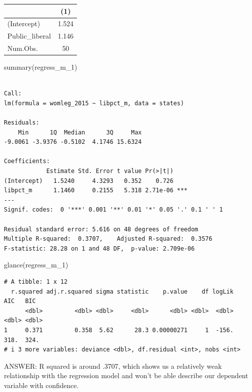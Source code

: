 \documentclass[
  letterpaper,
  DIV=11,
  numbers=noendperiod]{scrartcl}
\newenvironment{Shaded}{\begin{snugshade}}{\end{snugshade}}
\newcommand{\FunctionTok}[1]{\textcolor[rgb]{0.28,0.35,0.67}{#1}}
\newcommand{\NormalTok}[1]{\textcolor[rgb]{0.00,0.23,0.31}{#1}}
\begin{document}
\begin{table}
\centering
\begin{tabular}[t]{lc}
\toprule
  & (1)\\
\midrule
(Intercept) & \num{1.524}\\
Public\_liberal & \num{1.146}\\
\midrule
Num.Obs. & \num{50}\\
\bottomrule
\end{tabular}
\end{table}

\begin{Shaded}
\begin{Highlighting}[]
\FunctionTok{summary}\NormalTok{(regress\_m\_1)}
\end{Highlighting}
\end{Shaded}

\begin{verbatim}

Call:
lm(formula = womleg_2015 ~ libpct_m, data = states)

Residuals:
    Min      1Q  Median      3Q     Max 
-9.0061 -3.9376 -0.5102  4.1746 15.6324 

Coefficients:
            Estimate Std. Error t value Pr(>|t|)    
(Intercept)   1.5240     4.3293   0.352    0.726    
libpct_m      1.1460     0.2155   5.318 2.71e-06 ***
---
Signif. codes:  0 '***' 0.001 '**' 0.01 '*' 0.05 '.' 0.1 ' ' 1

Residual standard error: 5.616 on 48 degrees of freedom
Multiple R-squared:  0.3707,    Adjusted R-squared:  0.3576 
F-statistic: 28.28 on 1 and 48 DF,  p-value: 2.709e-06
\end{verbatim}

\begin{Shaded}
\begin{Highlighting}[]
\FunctionTok{glance}\NormalTok{(regress\_m\_1)}
\end{Highlighting}
\end{Shaded}

\begin{verbatim}
# A tibble: 1 x 12
  r.squared adj.r.squared sigma statistic    p.value    df logLik   AIC   BIC
      <dbl>         <dbl> <dbl>     <dbl>      <dbl> <dbl>  <dbl> <dbl> <dbl>
1     0.371         0.358  5.62      28.3 0.00000271     1  -156.  318.  324.
# i 3 more variables: deviance <dbl>, df.residual <int>, nobs <int>
\end{verbatim}

ANSWER: R squared is around .3707, which shows us a relatively weak
relationship with the regression model and won't be able describe our
dependent variable with confidence.
\end{document}
